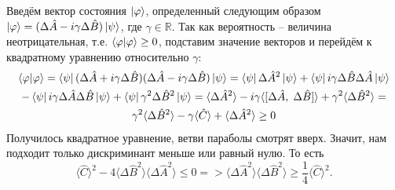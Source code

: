 Введём вектор состояния $\ket{\varphi}$, определенный следующим образом $\ket{\varphi} = (\Delta\hat A - i\gamma\Delta\hat B)\ket{\psi}$, где $\gamma \in \mathbb{R}$. Так как вероятность -- величина неотрицательная, т.е. $\bra{\varphi}\ket{\varphi} \geq 0$, подставим значение векторов и перейдём к квадратному уравнению относительно $\gamma$:
\begin{multline*}
\bra{\varphi}\ket{\varphi} = \bra{\psi}(\Delta\hat A + i\gamma\Delta\hat B) (\Delta\hat A - i\gamma\Delta\hat B)\ket{\psi} = \bra{\psi}\Delta\hat{A}^2\ket{\psi} + \bra{\psi}i\gamma\Delta\hat{B}\Delta\hat{A}\ket{\psi}\\ - \bra{\psi}i\gamma\Delta\hat{A}\Delta\hat{B}\ket{\psi} + \bra{\psi}\gamma^2\Delta\hat{B}^2\ket{\psi} = \langle \Delta\hat A^2\rangle - i\gamma\langle[\Delta\hat{A},\;\Delta\hat{B}]\rangle + \gamma^2\langle \Delta\hat B^2\rangle =\\ \gamma^2\langle\Delta\hat B^2\rangle - \gamma\langle\hat{C}\rangle + \langle\Delta\hat A^2\rangle  \geq 0
\end{multline*}
Получилось квадратное уравнение, ветви параболы смотрят вверх. Значит, нам подходит только дискриминант меньше или равный нулю. То есть
\[
\langle\hat C\rangle^2 - 4\langle\Delta\hat B^2\rangle \langle\Delta\hat A^2\rangle \leq 0 =>
\langle\Delta\hat A^2\rangle \langle\Delta\hat B^2\rangle \geq \frac{1}{4}\langle\hat C\rangle^2.
\]
